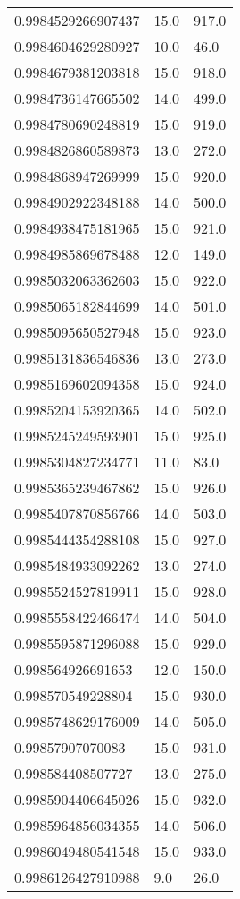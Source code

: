 \begin{center}
\begin{supertabular}[H]{p{0.30\textwidth}p{0.05\textwidth}p{0.05\textwidth}}
0.9984529266907437 & 15.0 & 917.0 \\ 
0.9984604629280927 & 10.0 & 46.0 \\ 
0.9984679381203818 & 15.0 & 918.0 \\ 
0.9984736147665502 & 14.0 & 499.0 \\ 
0.9984780690248819 & 15.0 & 919.0 \\ 
0.9984826860589873 & 13.0 & 272.0 \\ 
0.9984868947269999 & 15.0 & 920.0 \\ 
0.9984902922348188 & 14.0 & 500.0 \\ 
0.9984938475181965 & 15.0 & 921.0 \\ 
0.9984985869678488 & 12.0 & 149.0 \\ 
0.9985032063362603 & 15.0 & 922.0 \\ 
0.9985065182844699 & 14.0 & 501.0 \\ 
0.9985095650527948 & 15.0 & 923.0 \\ 
0.9985131836546836 & 13.0 & 273.0 \\ 
0.9985169602094358 & 15.0 & 924.0 \\ 
0.9985204153920365 & 14.0 & 502.0 \\ 
0.9985245249593901 & 15.0 & 925.0 \\ 
0.9985304827234771 & 11.0 & 83.0 \\ 
0.9985365239467862 & 15.0 & 926.0 \\ 
0.9985407870856766 & 14.0 & 503.0 \\ 
0.9985444354288108 & 15.0 & 927.0 \\ 
0.9985484933092262 & 13.0 & 274.0 \\ 
0.9985524527819911 & 15.0 & 928.0 \\ 
0.9985558422466474 & 14.0 & 504.0 \\ 
0.9985595871296088 & 15.0 & 929.0 \\ 
0.998564926691653 & 12.0 & 150.0 \\ 
0.998570549228804 & 15.0 & 930.0 \\ 
0.9985748629176009 & 14.0 & 505.0 \\ 
0.99857907070083 & 15.0 & 931.0 \\ 
0.998584408507727 & 13.0 & 275.0 \\ 
0.9985904406645026 & 15.0 & 932.0 \\ 
0.9985964856034355 & 14.0 & 506.0 \\ 
0.9986049480541548 & 15.0 & 933.0 \\ 
0.9986126427910988 & 9.0 & 26.0 \\ 

\end{supertabular}
\end{center}
